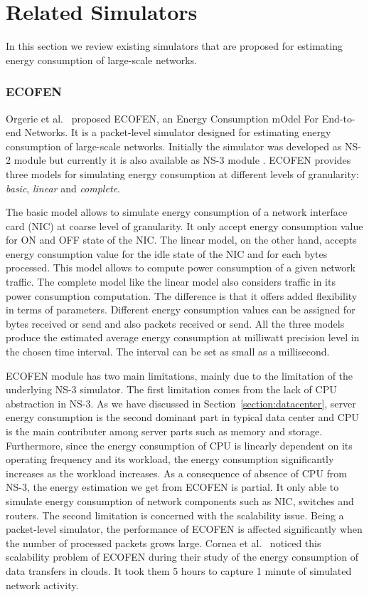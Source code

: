\section{Related Simulators}
\label{section:relatedsimulator} 
In this section we review existing simulators that are proposed for estimating energy consumption of large-scale networks. 
\subsubsection{ECOFEN}
\label{subsection:ecofen} 
Orgerie et al.{\ }\cite{DBLP:conf/wowmom/OrgerieLLL11} proposed ECOFEN, an Energy Consumption
mOdel For End-to-end Networks. It is a packet-level simulator designed for estimating energy consumption of large-scale networks. Initially the simulator was developed as NS-2 module but currently it is also available as NS-3 module \cite{DBLP:conf/cloudnet/CorneaOL14}. ECOFEN provides three models for simulating energy consumption at different levels of granularity: \emph{basic}, \emph{linear} and \emph{complete}.

The basic model allows to simulate energy consumption of a network interface card (NIC) at coarse level of granularity. It only accept energy consumption value for ON and OFF state of the NIC. The linear model, on the other hand, accepts energy consumption value for the idle state of the NIC and for each bytes processed. This model allows to compute power consumption of a given network traffic. The complete model like the linear model also considers traffic in its power consumption computation. The difference is that it offers added flexibility in terms of parameters. Different energy consumption values can be assigned for bytes received or send and also packets received or send. All the three models produce the estimated average energy consumption at milliwatt precision level in the chosen time interval. The interval can be set as small as a millisecond. 

ECOFEN module has two main limitations, mainly due to the limitation of the underlying NS-3 simulator. The first limitation comes from the lack of CPU abstraction in NS-3. As we have discussed in Section~\ref{section:datacenter}, server energy consumption is the second dominant part in typical data center and CPU is the main contributer among server parts such as memory and storage. Furthermore, since the energy consumption of CPU is linearly dependent on its operating frequency and its workload, the energy consumption significantly increases as the workload increases. As a consequence of absence of CPU from NS-3, the energy estimation we get from ECOFEN is partial. It only able to simulate energy consumption of network components such as NIC, switches and routers. The second limitation is concerned with the scalability issue. Being a packet-level simulator, the performance of ECOFEN is affected significantly when the number of processed packets grows large. Cornea et al.{\ }\cite{DBLP:conf/cloudnet/CorneaOL14} noticed this scalability problem of ECOFEN during their study of the energy consumption of data transfers in clouds. It took them 5 hours to capture 1 minute of simulated network activity. 
